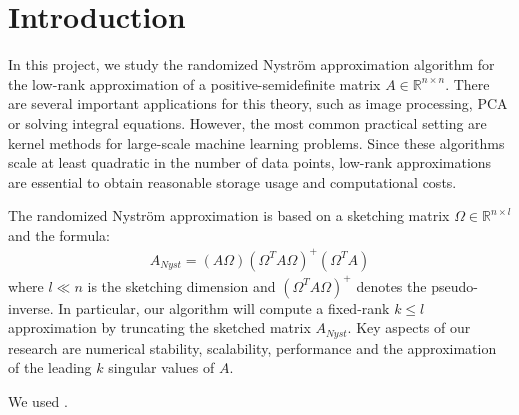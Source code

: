 \documentclass{article}
\date{\today}
\theoremstyle{definition}
\begin{document}
\hypersetup{pageanchor=false}


\clearpage
\thispagestyle{empty}
\tableofcontents

\clearpage
\hypersetup{pageanchor=true} %
\setcounter{page}{1}

\section{Introduction}
In this project, we study the randomized Nyström approximation algorithm for the low-rank approximation of a positive-semidefinite matrix $A\in \mathbb{R}^{n \times n}$. There are several important applications for this theory, such as image processing, PCA or solving integral equations. However, the most common practical setting are kernel methods for large-scale machine learning problems. Since these algorithms scale at least quadratic in the number of data points, low-rank approximations are essential to obtain reasonable storage usage and computational costs. 

The randomized Nyström approximation is based on a sketching matrix $\Omega \in \mathbb{R}^{n \times l}$ and the formula:
\begin{align}
    \label{nyst:sketching_formula}
    A_{Nyst} = (A \Omega) (\Omega^T A \Omega)^+ (\Omega^T A)
\end{align}
where $l \ll n$ is the sketching dimension and $(\Omega^T A \Omega)^+$ denotes the pseudo-inverse. In particular, our algorithm will compute a fixed-rank $k \leq l$ approximation by truncating the sketched matrix $A_{Nyst}$. Key aspects of our research are numerical stability, scalability, performance and the approximation of the leading $k$ singular values of $A$.

We used \cite{golub2013a}.
\end{document}
